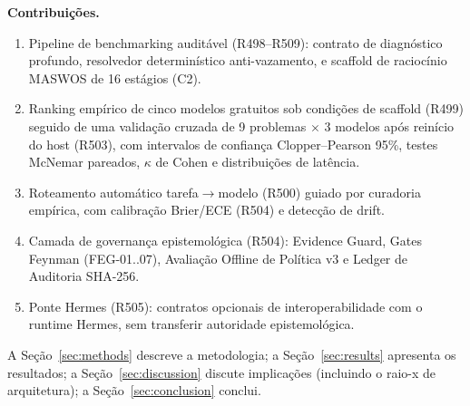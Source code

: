 \textbf{Contribuições.}
\begin{enumerate}
  \item Pipeline de benchmarking auditável (R498--R509): contrato de
  diagnóstico profundo, resolvedor determinístico anti-vazamento, e scaffold
  de raciocínio MASWOS de 16 estágios (C2).
  \item Ranking empírico de cinco modelos gratuitos sob condições de scaffold
  (R499) seguido de uma validação cruzada de 9 problemas $\times$ 3 modelos
  após reinício do host (R503), com intervalos de confiança Clopper--Pearson
  95\%, testes McNemar pareados, $\kappa$ de Cohen e distribuições de latência.
  \item Roteamento automático tarefa$\rightarrow$modelo (R500) guiado por
  curadoria empírica, com calibração Brier/ECE (R504) e detecção de drift.
  \item Camada de governança epistemológica (R504): Evidence Guard, Gates
  Feynman (FEG-01..07), Avaliação Offline de Política v3 e Ledger de
  Auditoria SHA-256.
  \item Ponte Hermes (R505): contratos opcionais de interoperabilidade com o
  runtime Hermes, sem transferir autoridade epistemológica.
\end{enumerate}

A Seção~\ref{sec:methods} descreve a metodologia; a
Seção~\ref{sec:results} apresenta os resultados; a
Seção~\ref{sec:discussion} discute implicações (incluindo o raio-x de
arquitetura); a Seção~\ref{sec:conclusion} conclui.
